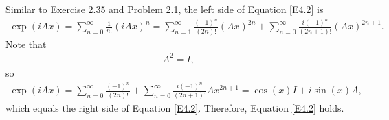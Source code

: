 \documentclass[en]{sol-man}
\begin{document}
\begin{pf}
    Similar to Exercise 2.35 and Problem 2.1, the left side of Equation \eqref{E4.2} is
    \begin{align}
        \exp(iAx)=\sum_{n=0}^{\infty}\frac{1}{n!}(iAx)^n=\sum_{n=1}^{\infty}\frac{(-1)^n}{(2n)!}(Ax)^{2n}+\sum_{n=0}^{\infty}\frac{i(-1)^n}{(2n+1)!}(Ax)^{2n+1}.
    \end{align}
    Note that
    \begin{align}
        A^2=I,
    \end{align}
    so
    \begin{align}
        \exp(iAx)=\sum_{n=0}^{\infty}\frac{(-1)^n}{(2n)!}+\sum_{n=0}^{\infty}\frac{i(-1)^n}{(2n+1)!}Ax^{2n+1}=\cos(x)I+i\sin(x)A,
    \end{align}
    which equals the right side of Equation \eqref{E4.2}.
    Therefore, Equation \eqref{E4.2} holds.


\end{pf}
\end{document}

